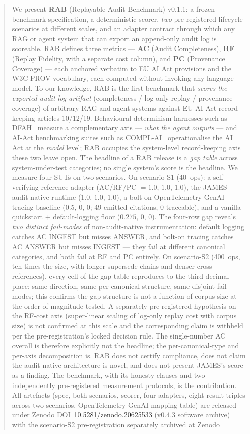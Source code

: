 \documentclass[11pt,a4paper]{article}
\begin{document}
\begin{abstract}
We present \textbf{RAB} (Replayable-Audit Benchmark) v0.1.1: a frozen benchmark specification, a deterministic scorer, \emph{two} pre-registered lifecycle scenarios at different scales, and an adapter contract through which any RAG or agent system that can export an append-only audit log is scoreable. RAB defines three metrics --- \textbf{AC} (Audit Completeness), \textbf{RF} (Replay Fidelity, with a separate cost column), and \textbf{PC} (Provenance Coverage) --- each anchored verbatim to EU AI Act provisions and the W3C PROV vocabulary, each computed without invoking any language model. To our knowledge, RAB is the first benchmark that \emph{scores the exported audit-log artifact} (completeness / log-only replay / provenance coverage) of arbitrary RAG and agent systems against EU AI Act record-keeping articles 10/12/19. Behavioural-determinism harnesses such as DFAH~\cite{khatchadourian2026dfah} measure a complementary axis --- \emph{what the agent outputs} --- and AI-Act benchmarking suites such as COMPL-AI~\cite{guldimann2024complai} operationalise the AI Act at the \emph{model} level; RAB occupies the system-level record-keeping axis these two leave open. The headline of a RAB release is a \emph{gap table} across system-under-test categories; no single system's score is the headline. We measure four SUTs on two scenarios. On scenario-S1 (40~ops): a self-verifying reference adapter (AC/RF/PC $=1.0$, $1.0$, $1.0$), the JAMES audit-native runtime ($1.0$, $1.0$, $1.0$), a bolt-on OpenTelemetry-GenAI tracing baseline ($0.5$, $0$, $0$; 49 emitted citations, 0 traceable), and a vanilla quickstart + default-logging floor ($0.275$, $0$, $0$). The four-row gap reveals \emph{two distinct fail-modes} of non-audit-native instrumentation: default logging catches AC INGEST but misses ANSWER, and bolt-on tracing catches AC ANSWER but misses INGEST --- they fail at different canonical categories, and both fail at RF and PC entirely. On scenario-S2 (400~ops, ten times the size, with longer supersede chains and denser cross-references), every cell of the gap table reproduces to the third decimal place: same direction, same per-canonical structure, same disjoint fail-modes; this confirms the gap structure is not a function of corpus size at the order of magnitude tested. A separately pre-registered hypothesis on the RF-cost axis (super-linear scaling of log-only replay cost with corpus size) is not confirmed at this scale and the corresponding claim is withheld per the pre-registration's locked decision rule. The single-number AC overall is therefore explicitly not the headline; the per-canonical-type and per-axis decomposition is. RAB does not certify compliance, does not claim the audit-native architecture is novel, and does not present JAMES's score as a finding. The benchmark, with its honesty clauses and two independently pre-registered measurement protocols, is the contribution. All artefacts (spec, both scenarios, scorer, four adapters, eight result triples across two scenarios, OpenTelemetry-GenAI mapping table) are released under Zenodo DOI~\href{https://doi.org/10.5281/zenodo.20625533}{10.5281/zenodo.20625533} (v0.4.3 software archive) with the scenario-S2 pre-registration separately archived at Zenodo 
\end{abstract}
\end{document}
